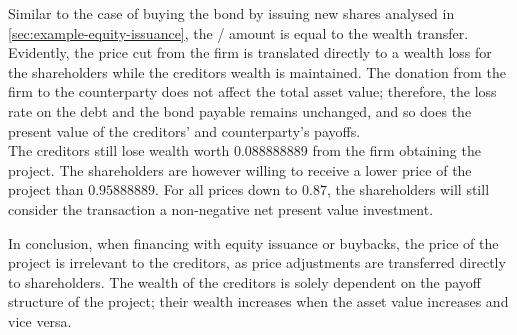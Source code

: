 \documentclass[main.tex]{subfiles}
\begin{document}
            Similar to the case of buying the bond by issuing new shares analysed in \cref{sec:example-equity-issuance},
            the \FVA/ amount is equal to the wealth transfer.
            Evidently, the price cut from the firm is translated directly to a wealth loss
            for the shareholders while the creditors wealth is maintained. 
            The donation from the firm to the counterparty does not affect the total asset value;
            therefore, the loss rate on the debt and the bond payable remains unchanged,
            and so does the present value of the creditors' and counterparty's payoffs.
            \\
            The creditors still lose wealth worth \num{0.088888889} from the firm obtaining the project.
            The shareholders are however willing to receive a lower price of the project than $\num{0.95888889}$.
            For all prices down to $\num{0.87}$,
            the shareholders will still consider the transaction a non-negative net present value investment.

            In conclusion, when financing with equity issuance or buybacks,
            the price of the project is irrelevant to the creditors,
            as price adjustments are transferred directly to shareholders.
            The wealth of the creditors is solely dependent on the payoff structure of the project;
            their wealth increases when the asset value increases and vice versa.
\end{document}

